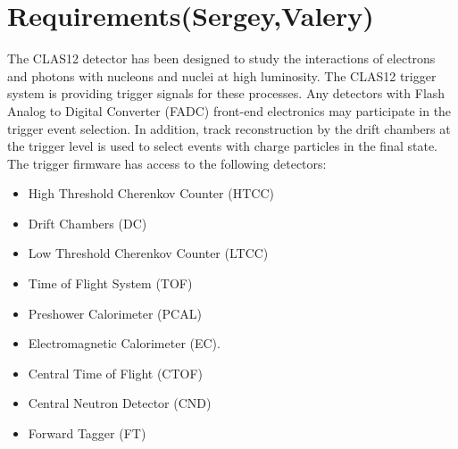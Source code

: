 \section{Requirements(Sergey,Valery)}

The CLAS12 detector  has been designed to study the interactions of electrons and photons with nucleons and nuclei at high luminosity. 
The CLAS12 trigger system is providing trigger signals for these processes. 
Any detectors with Flash Analog to Digital Converter (FADC) front-end electronics may participate in the trigger event selection.  In addition, track reconstruction by the drift chambers at the trigger level is used to select events with charge particles in the final state. 
The trigger firmware has access to  the following detectors:
\begin{itemize}
	\item High Threshold Cherenkov Counter (HTCC)
	\item Drift Chambers (DC)
	\item Low Threshold Cherenkov Counter (LTCC)
	\item Time of Flight System (TOF)
	\item Preshower Calorimeter (PCAL)
	\item Electromagnetic Calorimeter (EC).
	\item Central Time of Flight (CTOF)
	\item Central Neutron Detector (CND)
	\item Forward Tagger (FT)
\end{itemize}
